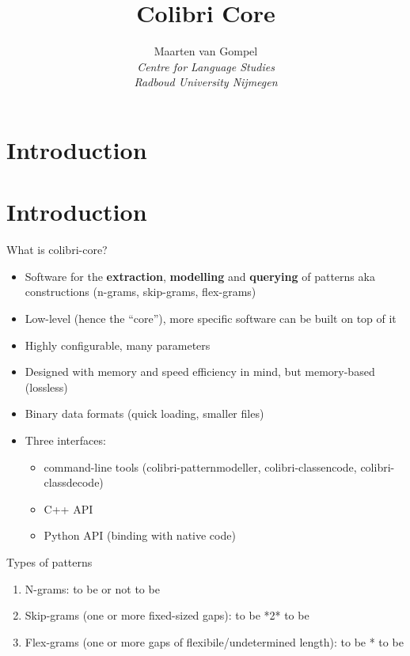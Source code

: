 \documentclass[compress]{beamer}
\title{Colibri Core}
\author{Maarten van Gompel \\ 
\emph{Centre for Language Studies} \\ \emph{Radboud University Nijmegen}}
\date{
\begin{center}
\texttt{[image: ru-beeldmerk-zwart.eps]}
\end{center}
August 28th, 2014}
\begin{document}
\section{Introduction}

\begin{frame}[fragile]
\maketitle
\end{frame}



\section{Introduction}


\begin{frame}
  \begin{block}{What is colibri-core?}
    \begin{itemize}
     \item Software for the \textbf{extraction}, \textbf{modelling} and
       \textbf{querying} of patterns aka constructions (n-grams, skip-grams, flex-grams)
     \item Low-level (hence the ``core''), more specific software can be built
       on top of it
     \item Highly configurable, many parameters
     \item Designed with memory and speed efficiency in mind, but memory-based
       (lossless)
     \item Binary data formats (quick loading, smaller files)
     \item Three interfaces:
      \begin{itemize}
        \item command-line tools (colibri-patternmodeller,
          colibri-classencode, colibri-classdecode)
        \item C++ API
        \item Python API (binding with native code)
      \end{itemize}
    \end{itemize}
  \end{block}
\end{frame}



\begin{frame}
  \begin{block}{Types of patterns}
    \begin{enumerate}
      \item N-grams: to be or not to be
      \item Skip-grams (one or more fixed-sized gaps): to be {*2*} to be
      \item Flex-grams (one or more gaps of flexibile/undetermined length): to be {*} to be
    \end{enumerate}
  \end{block}
\end{frame}
\end{document}
